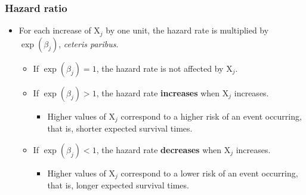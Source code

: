 \documentclass{beamer}
\begin{document}
\begin{frame}
\frametitle{Hazard ratio}
\begin{itemize}
\item For each increase of $\mathrm{X}_j$ by one unit, the hazard rate is \alert{multiplied} by $\exp(\beta_j)$, \textit{ceteris paribus}.
\begin{itemize}
\vp \vp
\item If $\exp(\beta_j)=1$,  the hazard rate is not affected by $\mathrm{X}_j$.
\item If $\exp(\beta_j)>1$, the hazard rate \textbf{increases} when $\mathrm{X}_j$ increases. 
\begin{itemize}
\vp \vp
\item Higher values of $\mathrm{X}_j$ correspond to a higher risk of an event occurring, that is, shorter expected survival times.
\end{itemize}
\item If $\exp(\beta_j)<1$, the hazard rate \textbf{decreases} when $\mathrm{X}_j$ increases. 
\begin{itemize}
\vp \vp
\item Higher values of $\mathrm{X}_j$ correspond to a lower risk of an event occurring, that is, longer expected survival times.
\end{itemize}
\end{itemize}
\end{itemize}
\end{frame}
\end{document}
